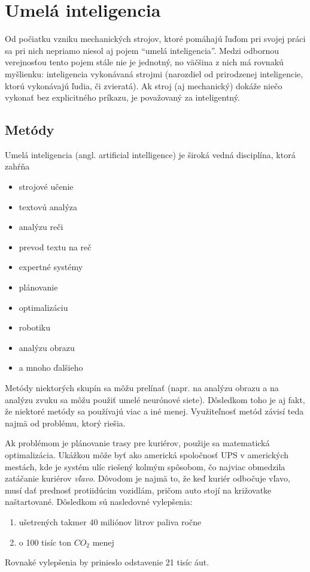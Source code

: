 \section{Umelá inteligencia}\label{sec:ai}

Od počiatku vzniku mechanických strojov, ktoré pomáhajú ľuďom pri svojej práci sa pri nich nepriamo niesol aj pojem
\enquote{umelá inteligencia}.
Medzi odbornou verejnosťou tento pojem stále nie je jednotný, no väčšina z nich má rovnakú myšlienku:
inteligencia vykonávaná strojmi (narozdiel od prirodzenej inteligencie, ktorú vykonávajú ľudia, či zvieratá).
Ak stroj (aj mechanický) dokáže niečo vykonať bez explicitného príkazu, je považovaný za inteligentný.

\subsection{Metódy}\label{subsec:ai-methods}

Umelá inteligencia (angl. artificial intelligence) je široká vedná disciplína, ktorá zahŕňa
\begin{itemize}
    \item strojové učenie
    \item textovú analýza
    \item analýzu reči
    \item prevod textu na reč
    \item expertné systémy
    \item plánovanie
    \item optimalizáciu
    \item robotiku
    \item analýzu obrazu
    \item a mnoho ďalšieho
\end{itemize}
Metódy niektorých skupín sa môžu prelínať (napr. na analýzu obrazu a na analýzu zvuku sa môžu použiť umelé neurónové
siete).
Dôsledkom toho je aj fakt, že niektoré metódy sa používajú viac a iné menej.
Využiteľnosť metód závisí teda najmä od problému, ktorý riešia.

Ak problémom je plánovanie trasy pre kuriérov, použije sa matematická optimalizácia.
Ukážkou môže byť ako americká spoločnosť UPS v amerických mestách, kde je systém ulíc riešený kolmým spôsobom, čo
najviac obmedzila zatáčanie kuriérov \emph{vľavo}.\cite{ups_optimization}
Dôvodom je najmä to, že keď kuriér odbočuje vľavo, musí dať prednosť protiidúcim vozidlám, pričom auto stojí na
križovatke naštartované.
Dôsledkom sú nasledovné vylepšenia:
\begin{enumerate}
    \item ušetrených takmer 40 miliónov litrov paliva ročne
    \item o 100 tisíc ton $CO_2$ menej
\end{enumerate}
Rovnaké vylepšenia by prinieslo odstavenie 21 tisíc áut.

